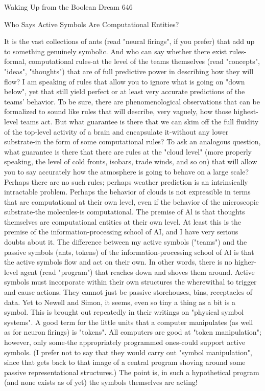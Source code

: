 Waking Up from the Boolean Dream                                                      646

              Who Says Active Symbols Are Computational Entities?

         It is the vast collections of ants (read "neural firings", if you prefer) that add up
to something genuinely symbolic. And who can say whether there exist rules-formal,
computational rules-at the level of the teams themselves (read "concepts", "ideas",
"thoughts") that are of full predictive power in describing how they will flow? I am
speaking of rules that allow you to ignore what is going on "down below", yet that
still yield perfect or at least very accurate predictions of the teams' behavior.
         To be sure, there are phenomenological observations that can be formalized to
sound like rules that will describe, very vaguely, how those highest-level teams act.
But what guarantee is there that we can skim off the full fluidity of the top-level
activity of a brain and encapsulate it-without any lower substrate-in the form of some
computational rules?
         To ask an analogous question, what guarantee is there that there are rules at
the "cloud level" (more properly speaking, the level of cold fronts, isobars, trade
winds, and so on) that will allow you to say accurately how the atmosphere is going to
behave on a large scale? Perhaps there are no such rules; perhaps weather prediction
is an intrinsically intractable problem. Perhaps the behavior of clouds is not
expressible in terms that are computational at their own level, even if the behavior of
the microscopic substrate-the molecules-is computational.
         The premise of Al is that thoughts themselves are computational entities at
their own level. At least this is the premise of the information-processing school of
AI, and I have very serious doubts about it.
         The difference between my active symbols ("teams") and the passive symbols
(ants, tokens) of the information-processing school of Al is that the active symbols
flow and act on their own. In other words, there is no higher-level agent (read
"program") that reaches down and shoves them around. Active symbols must
incorporate within their own structures the wherewithal to trigger and cause actions.
They cannot just be passive storehouses, bins, receptacles of data. Yet to Newell and
Simon, it seems, even so tiny a thing as a bit is a symbol. This is brought out
repeatedly in their writings on "physical symbol systems".
         A good term for the little units that a computer manipulates (as well as for
neuron firings) is "tokens". All computers are good at "token manipulation"; however,
only some-the appropriately programmed ones-could support active symbols. (I prefer
not to say that they would carry out "symbol manipulation", since that gets back to
that image of a central program shoving around some passive representational
structures.) The point is, in such a hypothetical program (and none exists as of yet) the
symbols themselves are acting!




